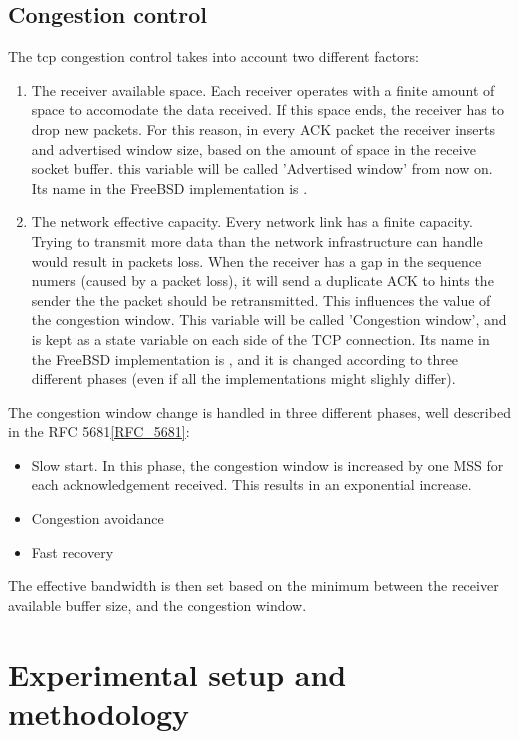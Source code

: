 \documentclass[a4paper,10pt]{article}
\begin{document}
\subsection{Congestion control}
The tcp congestion control takes into account two different factors: 
\begin{enumerate}
   \item The receiver available space. Each receiver operates with a finite
      amount of space to accomodate the data received. If this space ends, the
      receiver has to drop new packets. For this reason, in every ACK packet
      the receiver inserts and advertised window size, based on the amount of
      space in the receive socket buffer. this variable will be called
      'Advertised window' from now on. Its name in the FreeBSD implementation
      is .  
   \item The network effective capacity. Every network link has a finite
      capacity. Trying to transmit more data than the network infrastructure
      can handle would result in packets loss. When the receiver has a gap in
      the sequence numers (caused by a packet loss), it will send a duplicate
      ACK to hints the sender the the packet should be retransmitted. This
      influences the value of the congestion window.  This variable will be
      called 'Congestion window', and is kept as a state variable on each side
      of the TCP connection. Its name in the FreeBSD implementation is
      , and it is changed according to three different
      phases (even if all the implementations might slighly differ).
\end{enumerate}
The congestion window change is handled in three different phases, well described in the RFC 5681\ref{RFC_5681}:
\begin{itemize}
   \item Slow start. In this phase, the congestion window is increased by one MSS for each acknowledgement received. This results in an exponential increase.
   \item Congestion avoidance
   \item Fast recovery
\end{itemize}
The effective bandwidth is then set based on the minimum between the receiver available buffer size, and the congestion window.

\section{Experimental setup and methodology}
\end{document}
